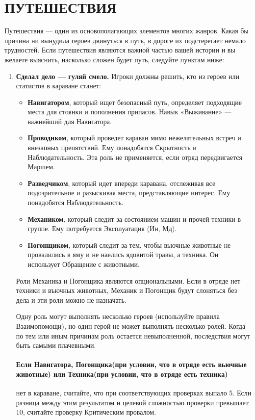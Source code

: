 \section{ПУТЕШЕСТВИЯ}
Путешествия — один из основополагающих элементов многих жанров. Какая бы причина ни вынудила героев двинуться в путь, в дороге их подстерегает немало трудностей. Если путешествия являются важной частью вашей истории и вы желаете выяснить, насколько сложен будет путь, следуйте пунктам ниже:
\begin{enumerate}
\item \textbf{Сделал дело — гуляй смело.} Игроки должны решить, кто из героев или статистов в караване станет:
\begin{itemize}
\item \textbf{Навигатором}, который ищет безопасный путь, определяет подходящие места для стоянки и пополнения припасов. Навык «Выживание» — важнейший для Навигатора.
\item \textbf{Проводнком}, который проведет караван мимо нежелательных встреч и внезапных препятствий. Ему понадобятся Скрытность и Наблюдательность. Эта роль не применяется, если отряд передвигается Маршем. 
\item \textbf{Разведчиком}, который идет впереди каравана, отслеживая все подозрительное и разыскивая места, представляющие интерес. Ему понадобятся Наблюдательность.
\item \textbf{Механиком}, который следит за состоянием машин и прочей техники в группе. Ему потребуется Эксплуатация (Ин, Мд).
\item \textbf{Погонщиком}, который следит за тем, чтобы вьючные животные не провалились в яму и не наелись ядовитой травы, а техника. Он использует Обращение с животными.
\end{itemize}
\begin{tcolorbox}
Роли Механика и Погонщика являются опциональными. Если в отряде нет техники и въючных животных, Механик и Погонщик будут слоняться без дела и эти роли можно не назначать.
\end{tcolorbox}
Одну роль могут выполнять несколько героев (используйте правила Взаимопомощи), но один герой не может выполнять несколько ролей.
\newline
Когда по тем или иным причинам роль остается невыполненной, последствия могут быть самыми плачевными.
\paragraph{Если Навигатора, Погонщика(при условии, что в отряде есть вьючные животные) или Техника(при условии, что в отряде есть техника)} нет в караване, считайте, что при соответствующих проверках выпало 5. Если разница между этим результатом и целевой сложностью проверки превышает 10, считайте проверку Критическим провалом.

\end{enumerate}
